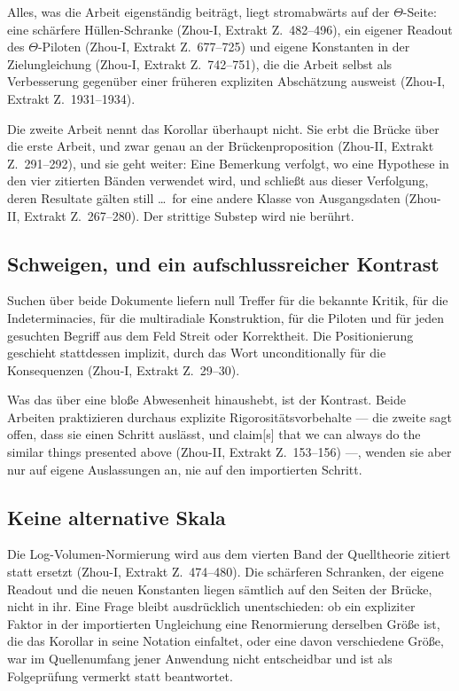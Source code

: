 \documentclass[11pt,a4paper]{article}
\theoremstyle{definition}
\newcommand{\anchor}[2]{(#1, Extrakt Z.~#2)}
\begin{document}
Alles, was die Arbeit eigenständig beiträgt, liegt stromabwärts auf der
$\Theta$-Seite: eine schärfere Hüllen-Schranke \anchor{Zhou-I}{482--496}, ein
eigener Readout des $\Theta$-Piloten \anchor{Zhou-I}{677--725} und eigene
Konstanten in der Zielungleichung \anchor{Zhou-I}{742--751}, die die Arbeit selbst
als Verbesserung gegenüber einer früheren expliziten Abschätzung ausweist
\anchor{Zhou-I}{1931--1934}.

Die zweite Arbeit nennt das Korollar überhaupt nicht. Sie erbt die Brücke über die
erste Arbeit, und zwar genau an der Brückenproposition
\anchor{Zhou-II}{291--292}, und sie geht weiter: Eine Bemerkung verfolgt, wo eine
Hypothese in den vier zitierten Bänden verwendet wird, und schließt aus dieser
Verfolgung, deren Resultate gälten \glqq still \dots\ for\grqq{} eine andere Klasse von
Ausgangsdaten \anchor{Zhou-II}{267--280}. Der strittige Substep wird nie berührt.

\subsection{Schweigen, und ein aufschlussreicher Kontrast}

Suchen über beide Dokumente liefern null Treffer für die bekannte Kritik, für die
Indeterminacies, für die multiradiale Konstruktion, für die Piloten und für jeden
gesuchten Begriff aus dem Feld Streit oder Korrektheit. Die Positionierung
geschieht stattdessen implizit, durch das Wort \glqq unconditionally\grqq{} für die
Konsequenzen \anchor{Zhou-I}{29--30}.

Was das über eine bloße Abwesenheit hinaushebt, ist der Kontrast. Beide Arbeiten
praktizieren durchaus explizite Rigorositätsvorbehalte --- die zweite sagt offen,
dass sie einen Schritt auslässt, und \glqq claim[s] that we can always do the similar
things presented above\grqq{} \anchor{Zhou-II}{153--156} ---, wenden sie aber nur auf
eigene Auslassungen an, nie auf den importierten Schritt.

\subsection{Keine alternative Skala}

Die Log-Volumen-Normierung wird aus dem vierten Band der Quelltheorie zitiert
statt ersetzt \anchor{Zhou-I}{474--480}. Die schärferen Schranken, der eigene
Readout und die neuen Konstanten liegen sämtlich auf den Seiten der Brücke, nicht
in ihr. Eine Frage bleibt ausdrücklich unentschieden: ob ein expliziter Faktor in
der importierten Ungleichung eine Renormierung derselben Größe ist, die das
Korollar in seine Notation einfaltet, oder eine davon verschiedene Größe, war im
Quellenumfang jener Anwendung nicht entscheidbar und ist als Folgeprüfung vermerkt
statt beantwortet.
\end{document}
